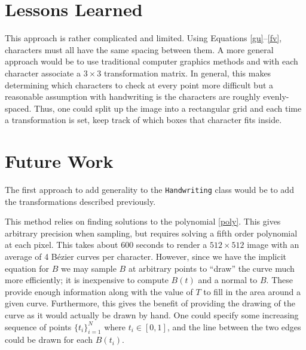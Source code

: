 \documentclass[12pt]{article}
\begin{document}
\section{Lessons Learned}
This approach is rather complicated and limited. Using Equations \eqref{gu}--\eqref{fv}, characters must all have the same spacing between them. A more general approach would be to use traditional computer graphics methods and with each character associate a $3 \times 3$ transformation matrix. In general, this makes determining which characters to check at every point more difficult but a reasonable assumption with handwriting is the characters are roughly evenly-spaced. Thus, one could split up the image into a rectangular grid and each time a transformation is set, keep track of which boxes that character fits inside.

\section{Future Work}
The first approach to add generality to the \texttt{Handwriting} class would be to add the transformations described previously.

This method relies on finding solutions to the polynomial \eqref{poly}. This gives arbitrary precision when sampling, but requires solving a fifth order polynomial at each pixel. This takes about 600 seconds to render a $512 \times 512$ image with an average of 4 B\'ezier curves per character. However, since we have the implicit equation for $B$ we may sample $B$ at arbitrary points to ``draw'' the curve much more efficiently; it is inexpensive to compute $B(t)$ and a normal to $B$. These provide enough information along with the value of $T$ to fill in the area around a given curve. Furthermore, this gives the benefit of providing the drawing of the curve as it would actually be drawn by hand. One could specify some increasing sequence of points $\{t_i\}_{i=1}^N$ where $t_i \in [0,1]$, and the line between the two edges could be drawn for each $B(t_i)$.
\end{document}
